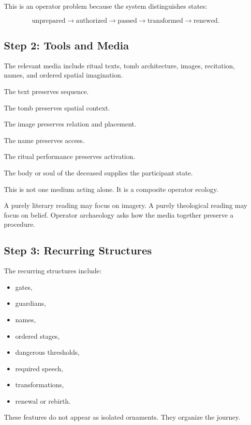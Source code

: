 \documentclass[11pt]{book}
\begin{document}
This is an operator problem because the system distinguishes states:

\[
\text{unprepared}
\rightarrow
\text{authorized}
\rightarrow
\text{passed}
\rightarrow
\text{transformed}
\rightarrow
\text{renewed}.
\]

\subsection{Step 2: Tools and Media}

The relevant media include ritual texts, tomb architecture, images, recitation, names, and ordered spatial imagination.

The text preserves sequence.

The tomb preserves spatial context.

The image preserves relation and placement.

The name preserves access.

The ritual performance preserves activation.

The body or soul of the deceased supplies the participant state.

This is not one medium acting alone. It is a composite operator ecology.

A purely literary reading may focus on imagery. A purely theological reading may focus on belief. Operator archaeology asks how the media together preserve a procedure.

\subsection{Step 3: Recurring Structures}

The recurring structures include:

\begin{itemize}
    \item gates,
    \item guardians,
    \item names,
    \item ordered stages,
    \item dangerous thresholds,
    \item required speech,
    \item transformations,
    \item renewal or rebirth.
\end{itemize}

These features do not appear as isolated ornaments. They organize the journey.
\end{document}
